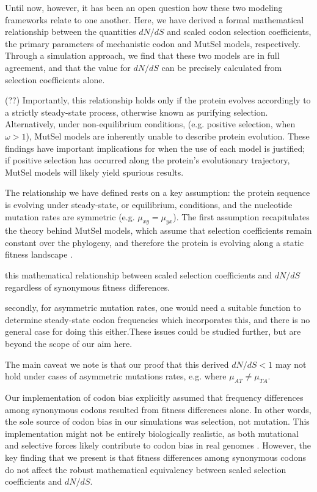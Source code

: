 \documentclass[11pt]{article}
\begin{document}
Until now, however, it has been an open question how these two modeling frameworks relate to one another. Here, we have derived a formal mathematical relationship between the quantities $dN/dS$ and scaled codon selection coefficients, the primary parameters of mechanistic codon and MutSel models, respectively. Through a simulation approach, we find that these two models are in full agreement, and that the value for $dN/dS$ can be precisely calculated from selection coefficients alone.


(??) Importantly, this relationship holds only if the protein evolves accordingly to a strictly steady-state process, otherwise known as purifying selection. Alternatively, under non-equilibrium conditions, (e.g. positive selection, when $\omega > 1$), MutSel models are inherently unable to describe protein evolution. These findings have important implications for when the use of each model is justified; if positive selection has occurred along the protein's evolutionary trajectory, MutSel models will likely yield spurious results.


The relationship we have defined rests on a key assumption: the protein sequence is evolving under steady-state, or equilibrium, conditions, and the nucleotide mutation rates are symmetric (e.g. $\mu_{xy} = \mu_{yx}$). The first assumption recapitulates the theory behind MutSel models, which assume that selection coefficients remain constant over the phylogeny, and therefore the protein is evolving along a static fitness landscape \cite{}. 

this mathematical relationship between scaled selection coefficients and $dN/dS$ regardless of synonymous fitness differences.


secondly, for asymmetric mutation rates, one would need a suitable function to determine steady-state codon frequencies which incorporates this, and there is no general case for doing this either.These issues could be studied further, but are beyond the scope of our aim here. 


The main caveat we note is that our proof that this derived $dN/dS < 1$ may not hold under cases of asymmetric mutations rates, e.g. where $\mu_{AT} \neq \mu_{TA}$.



Our implementation of codon bias explicitly assumed that frequency differences among synonymous codons resulted from fitness differences alone. In other words, the sole source of codon bias in our simulations was selection, not mutation. This implementation might not be entirely biologically realistic, as both mutational and selective forces likely contribute to codon bias in real genomes \cite{Blumer1991, Duret2002, HershbergPetrov2008, PlotkinKudla2010}. However, the key finding that we present is that fitness differences among synonymous codons do not affect the robust mathematical equivalency between scaled selection coefficients and $dN/dS$. 
\end{document}
